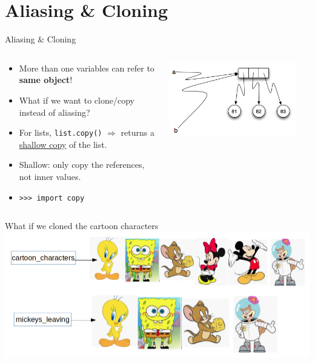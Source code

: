    \section{Aliasing \& Cloning}
    \begin{frame}{Aliasing \& Cloning}
        \Large
        \begin{columns}
            \begin{column}[c]{0.6\textwidth}
                \begin{itemize}
                    \item More than one variables can refer to \textbf{same object}!
                    \item What if we want to clone/copy instead of aliasing?
                    \item For lists, \texttt{list.copy()} $\Rightarrow$ returns a \underline{shallow copy} of the list.
                    \item Shallow: only copy the references, not inner values.
                    \item \texttt{>>> import copy}
                \end{itemize}
            \end{column}
            \begin{column}[c]{0.4\textwidth}
                \includegraphics[width=0.9\textwidth]{images/aliasing.png}
            \end{column}
        \end{columns}
    \end{frame}

    \begin{frame}{What if we cloned the cartoon characters}
        \pause
        \includegraphics[width=\textwidth]{images/list_cartoons/if_we_cloned.png}
    \end{frame}

